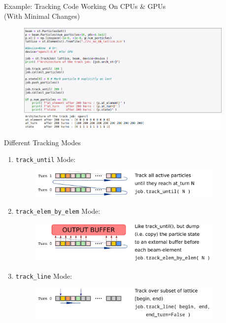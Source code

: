 \documentclass{beamer}
\begin{document}
\begin{frame}{Example: Tracking Code Working On CPUs \& GPUs\\(With Minimal Changes)}
    \begin{figure}[h]
        \centering
        \includegraphics[width=0.95\textwidth]{images/track_example_cpu_gpu.png}
    \end{figure}
\end{frame}

\begin{frame}{Different Tracking Modes}
\begin{enumerate}
    \item \texttt{track\_until\(\)} Mode:
    \begin{figure}[h]
        \centering
        \includegraphics[width=0.9\textwidth]{images/track_modes_01.png}
    \end{figure}
    
    \item \texttt{track\_elem\_by\_elem\(\)} Mode:
    \begin{figure}[h]
        \centering
        \includegraphics[width=0.9\textwidth]{images/track_modes_02.png}
    \end{figure}
    \item \texttt{track\_line\(\)} Mode:
    \begin{figure}[h]
        \centering
        \includegraphics[width=0.9\textwidth]{images/track_modes_03.png}
    \end{figure}
\end{enumerate}
\end{frame}
\end{document}
